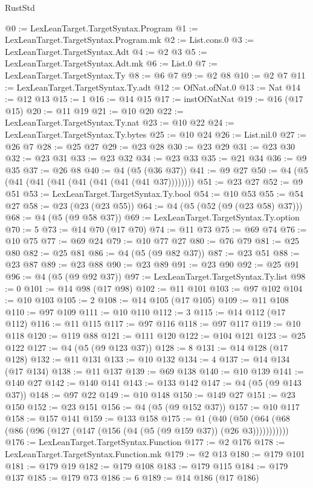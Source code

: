 \begin{lexlean}{RustStd}
\begin{coremodule}
@0 := LexLeanTarget.TargetSyntax.Program
@1 := LexLeanTarget.TargetSyntax.Program.mk
@2 := List.cons.{0}
@3 := LexLeanTarget.TargetSyntax.Adt
@4 := @2 @3
@5 := LexLeanTarget.TargetSyntax.Adt.mk
@6 := List.{0}
@7 := LexLeanTarget.TargetSyntax.Ty
@8 := @6 @7
@9 := @2 @8
@10 := @2 @7
@11 := LexLeanTarget.TargetSyntax.Ty.adt
@12 := OfNat.ofNat.{0}
@13 := Nat
@14 := @12 @13
@15 := 1
@16 := @14 @15
@17 := instOfNatNat
@19 := @16 (@17 @15)
@20 := @11 @19
@21 := @10 @20
@22 := LexLeanTarget.TargetSyntax.Ty.nat
@23 := @10 @22
@24 := LexLeanTarget.TargetSyntax.Ty.bytes
@25 := @10 @24
@26 := List.nil.{0}
@27 := @26 @7
@28 := @25 @27
@29 := @23 @28
@30 := @23 @29
@31 := @23 @30
@32 := @23 @31
@33 := @23 @32
@34 := @23 @33
@35 := @21 @34
@36 := @9 @35
@37 := @26 @8
@40 := @4 (@5 (@36 @37))
@41 := @9 @27
@50 := @4 (@5 (@41 (@41 (@41 (@41 (@41 (@41 (@41 @37))))))))
@51 := @23 @27
@52 := @9 @51
@53 := LexLeanTarget.TargetSyntax.Ty.bool
@54 := @10 @53
@55 := @54 @27
@58 := @23 (@23 (@23 @55))
@64 := @4 (@5 (@52 (@9 (@23 @58) @37)))
@68 := @4 (@5 (@9 @58 @37))
@69 := LexLeanTarget.TargetSyntax.Ty.option
@70 := 5
@73 := @14 @70 (@17 @70)
@74 := @11 @73
@75 := @69 @74
@76 := @10 @75
@77 := @69 @24
@79 := @10 @77 @27
@80 := @76 @79
@81 := @25 @80
@82 := @25 @81
@86 := @4 (@5 (@9 @82 @37))
@87 := @23 @51
@88 := @23 @87
@89 := @23 @88
@90 := @23 @89
@91 := @23 @90
@92 := @25 @91
@96 := @4 (@5 (@9 @92 @37))
@97 := LexLeanTarget.TargetSyntax.Ty.list
@98 := 0
@101 := @14 @98 (@17 @98)
@102 := @11 @101
@103 := @97 @102
@104 := @10 @103
@105 := 2
@108 := @14 @105 (@17 @105)
@109 := @11 @108
@110 := @97 @109
@111 := @10 @110
@112 := 3
@115 := @14 @112 (@17 @112)
@116 := @11 @115
@117 := @97 @116
@118 := @97 @117
@119 := @10 @118
@120 := @119 @88
@121 := @111 @120
@122 := @104 @121
@123 := @25 @122
@127 := @4 (@5 (@9 @123 @37))
@128 := 8
@131 := @14 @128 (@17 @128)
@132 := @11 @131
@133 := @10 @132
@134 := 4
@137 := @14 @134 (@17 @134)
@138 := @11 @137
@139 := @69 @138
@140 := @10 @139
@141 := @140 @27
@142 := @140 @141
@143 := @133 @142
@147 := @4 (@5 (@9 @143 @37))
@148 := @97 @22
@149 := @10 @148
@150 := @149 @27
@151 := @23 @150
@152 := @23 @151
@156 := @4 (@5 (@9 @152 @37))
@157 := @10 @117
@158 := @157 @141
@159 := @133 @158
@175 := @1 (@40 (@50 (@64 (@68 (@86 (@96 (@127 (@147 (@156 (@4 (@5 (@9 @159 @37)) (@26 @3)))))))))))
@176 := LexLeanTarget.TargetSyntax.Function
@177 := @2 @176
@178 := LexLeanTarget.TargetSyntax.Function.mk
@179 := @2 @13
@180 := @179 @101
@181 := @179 @19
@182 := @179 @108
@183 := @179 @115
@184 := @179 @137
@185 := @179 @73
@186 := 6
@189 := @14 @186 (@17 @186)

\end{coremodule}
\end{lexlean}
